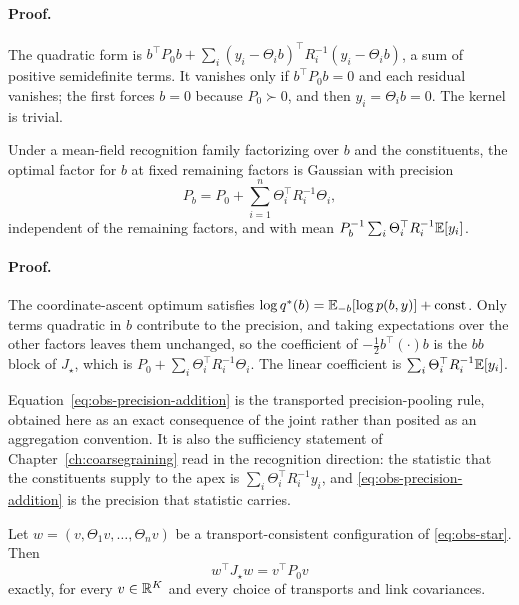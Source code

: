 \paragraph{Proof.}
The quadratic form is $b^{\top}P_0b+\sum_i(y_i-\Theta_ib)^{\top}R_i^{-1}(y_i-\Theta_ib)$, a sum of positive semidefinite terms. It vanishes only if $b^{\top}P_0b=0$ and each residual vanishes; the first forces $b=0$ because $P_0\succ0$, and then $y_i=\Theta_ib=0$. The kernel is trivial.

Under a mean-field recognition family factorizing over $b$ and the constituents, the optimal factor for $b$ at fixed remaining factors is Gaussian with precision
\begin{equation}
P_b=P_0+\sum_{i=1}^{n}\Theta_i^{\top}R_i^{-1}\Theta_i ,
\label{eq:obs-precision-addition}
\end{equation}
independent of the remaining factors, and with mean $P_b^{-1}\sum_i\Theta_i^{\top}R_i^{-1}\mathbb E[y_i]$.

\paragraph{Proof.}
The coordinate-ascent optimum satisfies $\log q^{*}(b)=\mathbb E_{-b}[\log p(b,y)]+\text{const}$. Only terms quadratic in $b$ contribute to the precision, and taking expectations over the other factors leaves them unchanged, so the coefficient of $-\tfrac12 b^{\top}(\cdot)b$ is the $bb$ block of $J_\star$, which is $P_0+\sum_i\Theta_i^{\top}R_i^{-1}\Theta_i$. The linear coefficient is $\sum_i\Theta_i^{\top}R_i^{-1}\mathbb E[y_i]$.

Equation~\eqref{eq:obs-precision-addition} is the transported precision-pooling rule, obtained here as an exact consequence of the joint rather than posited as an aggregation convention. It is also the sufficiency statement of Chapter~\ref{ch:coarsegraining} read in the recognition direction: the statistic that the constituents supply to the apex is $\sum_i\Theta_i^{\top}R_i^{-1}y_i$, and \eqref{eq:obs-precision-addition} is the precision that statistic carries.

Let $w=(v,\Theta_1v,\dots,\Theta_nv)$ be a transport-consistent configuration of \eqref{eq:obs-star}. Then
\begin{equation}
w^{\top}J_\star w=v^{\top}P_0v
\label{eq:obs-coercivity}
\end{equation}
exactly, for every $v\in\mathbb R^{K}$ and every choice of transports and link covariances.

